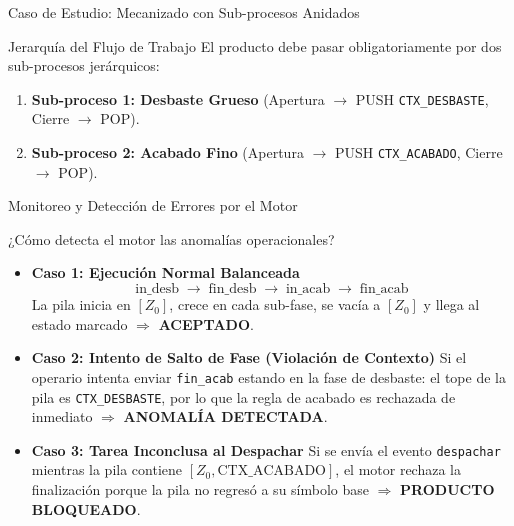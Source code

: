 \documentclass[10pt, aspectratio=169]{beamer}
\begin{document}
\begin{frame}{Caso de Estudio: Mecanizado con Sub-procesos Anidados}
	\begin{block}{Jerarquía del Flujo de Trabajo}
		El producto debe pasar obligatoriamente por dos sub-procesos jerárquicos:
		\begin{enumerate}
			\item \textbf{Sub-proceso 1: Desbaste Grueso} (Apertura $\to$ PUSH \texttt{CTX\_DESBASTE}, Cierre $\to$ POP).
			\item \textbf{Sub-proceso 2: Acabado Fino} (Apertura $\to$ PUSH \texttt{CTX\_ACABADO}, Cierre $\to$ POP).
		\end{enumerate}
	\end{block}

	\begin{center}
	\end{center}
\end{frame}

\begin{frame}{Monitoreo y Detección de Errores por el Motor}
	\begin{block}{¿Cómo detecta el motor las anomalías operacionales?}
		\begin{itemize}
			\item \textbf{Caso 1: Ejecución Normal Balanceada}
			\[ \text{in\_desb} \;\to\; \text{fin\_desb} \;\to\; \text{in\_acab} \;\to\; \text{fin\_acab} \]
			La pila inicia en $[Z_0]$, crece en cada sub-fase, se vacía a $[Z_0]$ y llega al estado marcado $\Rightarrow$ \textbf{ACEPTADO}.
			\item \textbf{Caso 2: Intento de Salto de Fase (Violación de Contexto)}
			Si el operario intenta enviar \texttt{fin\_acab} estando en la fase de desbaste: el tope de la pila es \texttt{CTX\_DESBASTE}, por lo que la regla de acabado es rechazada de inmediato $\Rightarrow$ \textbf{ANOMALÍA DETECTADA}.
			\item \textbf{Caso 3: Tarea Inconclusa al Despachar}
			Si se envía el evento \texttt{despachar} mientras la pila contiene $[Z_0, \text{CTX\_ACABADO}]$, el motor rechaza la finalización porque la pila no regresó a su símbolo base $\Rightarrow$ \textbf{PRODUCTO BLOQUEADO}.
		\end{itemize}
	\end{block}
\end{frame}
\end{document}
